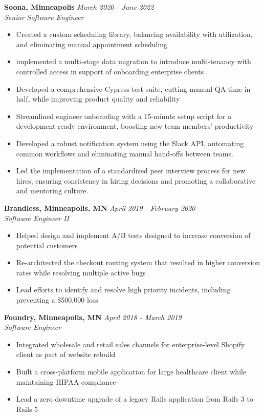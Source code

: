 \documentclass{res}
\begin{document}
\begin{resume}
		{\bf Soona, Minneapolis} \hfill \emph{March 2020 - June 2022} \\
			\emph{Senior Software Engineer}

			\begin{itemize} \itemsep -2pt
        \item Created a custom scheduling library, balancing availability with utilization, and eliminating manual appointment scheduling
        \item implemented a multi-stage data migration to introduce multi-tenancy with controlled access in support of onboarding enterprise clients
        \item Developed a comprehensive Cypress test suite, cutting manual QA time in half, while improving product quality and reliability
        \item Streamlined engineer onboarding with a 15-minute setup script for a development-ready environment, boosting new team members' productivity
        \item Developed a robust notification system using the Slack API, automating common workflows and eliminating manual hand-offs between teams.
        \item Led the implementation of a standardized peer interview process for new hires, ensuring consistency in hiring decisions and promoting a collaborative and mentoring culture.
			\end{itemize}

		{\bf Brandless, Minneapolis, MN} \hfill \emph{April 2019 - February 2020} \\
			\emph{Software Engineer II}

			\begin{itemize} \itemsep -2pt
				\item Helped design and implement A/B tests designed to increase conversion of potential customers
        \item Re-architected the checkout routing system that resulted in higher conversion rates while resolving multiple active bugs
        \item Lead efforts to identify and resolve high priority incidents, including preventing a \$500,000 loss
			\end{itemize}

		{\bf Foundry, Minneapolis, MN} \hfill \emph{April 2018 - March 2019} \\
			\emph{Software Engineer}

			\begin{itemize} \itemsep -2pt
				\item Integrated wholesale and retail sales channels for enterprise-level Shopify client as part of website rebuild
				\item Built a cross-platform mobile application for large healthcare client while maintaining HIPAA compliance
				\item Lead a zero downtime upgrade of a legacy Rails application from Rails 3 to Rails 5
			\end{itemize}


\end{resume}
\end{document}
